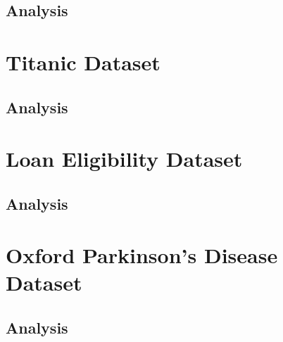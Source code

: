 \documentclass{article}
\begin{document}
\subsection*{Analysis}


\newpage
\section*{Titanic Dataset}

\subsection*{Analysis}


\newpage
\section*{Loan Eligibility Dataset}

\subsection*{Analysis}

\newpage
\section*{Oxford Parkinson's Disease Dataset}

\subsection*{Analysis}
\end{document}
